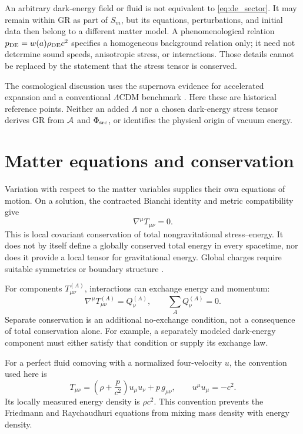 \documentclass[11pt]{article}
\begin{document}
An arbitrary dark-energy field or fluid is not equivalent to \eqref{eq:de_sector}. It may remain within GR as part of $S_m$, but its equations, perturbations, and initial data then belong to a different matter model. A phenomenological relation $p_{\rm DE}=w(a)\rho_{\rm DE}c^2$ specifies a homogeneous background relation only; it need not determine sound speeds, anisotropic stress, or interactions. Those details cannot be replaced by the statement that the stress tensor is conserved.

The cosmological discussion uses the supernova evidence for accelerated expansion and a conventional $\Lambda$CDM benchmark \parencite{Riess1998,Perlmutter1999,Planck2018Parameters}. Here these are historical reference points. Neither an added $\Lambda$ nor a chosen dark-energy stress tensor derives GR from $\mathcal A$ and $\Phi_{\mathrm{src}}$, or identifies the physical origin of vacuum energy.

\section{Matter equations and conservation}
Variation with respect to the matter variables supplies their own equations of motion. On a solution, the contracted Bianchi identity and metric compatibility give
\begin{equation}
\nabla^\mu T_{\mu\nu}=0.
\label{eq:conservation}
\end{equation}
This is local covariant conservation of total nongravitational stress--energy. It does not by itself define a globally conserved total energy in every spacetime, nor does it provide a local tensor for gravitational energy. Global charges require suitable symmetries or boundary structure \parencite{Carroll1997,ADM1962}.

For components $T^{(A)}_{\mu\nu}$, interactions can exchange energy and momentum:
\begin{equation}
\nabla^\mu T^{(A)}_{\mu\nu}=Q^{(A)}_\nu,
\qquad \sum_A Q^{(A)}_\nu=0.
\end{equation}
Separate conservation is an additional no-exchange condition, not a consequence of total conservation alone. For example, a separately modeled dark-energy component must either satisfy that condition or supply its exchange law.

For a perfect fluid comoving with a normalized four-velocity $u$, the convention used here is
\begin{equation}
T_{\mu\nu}=\left(\rho+\frac{p}{c^2}\right)u_\mu u_\nu+p\,g_{\mu\nu},
\qquad u^\mu u_\mu=-c^2.
\end{equation}
Its locally measured energy density is $\rho c^2$. This convention prevents the Friedmann and Raychaudhuri equations from mixing mass density with energy density.
\end{document}
